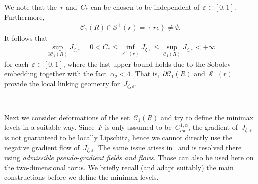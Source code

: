 \documentclass[11pt,final]{amsart}
\newcommand{\p}{\partial}
\newcommand{\eps}{\varepsilon}
\newcommand{\braces}[1]{\left\{#1\right\}} %
\begin{document}
We note that the~$r$ and~$C_*$ can be chosen to be independent of~$\eps\in [0,1]$.
Furthermore,
\begin{align}\label{eq:intersection}
    \mathscr{C}_1(R)\cap \mathscr{S}^+(r)= \braces{ r e} \neq\emptyset.
\end{align}
It follows that
\begin{align}\label{eq:level estimate}
    \sup_{\p \mathscr{C}_1(R)} J_{\zeta,\eps} = 0 
    < C_* 
    \leq  \inf_{\mathscr{S}^+(r)} J_{\zeta,\eps} 
    \leq \sup_{\mathscr{C}_1(R)} J_{\zeta,\eps} <+\infty
\end{align}
for each~$\eps\in [0,1]$, where the last upper bound holds due to the Sobolev embedding together with the fact~$\alpha_2<4$.
That is,~$\p\mathscr{C}_1(R)$ and~$\mathscr{S}^+(r)$ provide the local linking geometry for~$J_{\zeta,\eps}$. 

\

Next we consider deformations of the set~$\mathscr{C}_1(R)$ and try to define the minimax levels in a suitable way. 
Since~$F$ is only assumed to be~$C^{1,\alpha}_{loc}$, the gradient of~$J_{\zeta,\eps}$ is not guaranteed to be locally Lipschitz, hence we cannot directly use the negative gradient flow of~$J_{\zeta,\eps}$. 
The same issue arises in~\cite{WZ2026Stationary} and is resolved there using \emph{admissible pseudo-gradient fields and flows}. 
Those can also be used here on the two-dimensional torus. 
We briefly recall (and adapt suitably) the main constructions before we define the minimax levels. 
\end{document}
